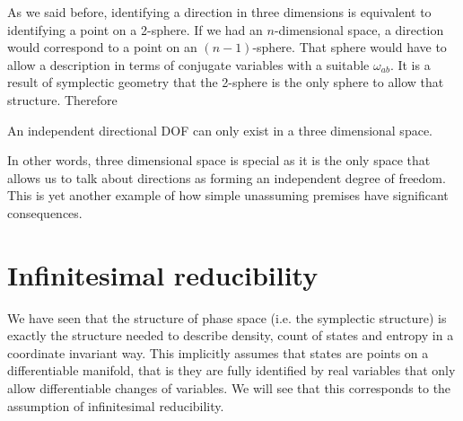 As we said before, identifying a direction in three dimensions is equivalent to identifying a point on a 2-sphere. If we had an $n$-dimensional space, a direction would correspond to a point on an $(n-1)$-sphere. That sphere would have to allow a description in terms of conjugate variables with a suitable $\omega_{ab}$. It is a result of symplectic geometry that the 2-sphere is the only sphere to allow that structure. Therefore
\begin{insight}
	An independent directional DOF can only exist in a three dimensional space.
\end{insight}

In other words, three dimensional space is special as it is the only space that allows us to talk about directions as forming an independent degree of freedom. This is yet another example of how simple unassuming premises have significant consequences.

\section{Infinitesimal reducibility}

We have seen that the structure of phase space (i.e. the symplectic structure) is exactly the structure needed to describe density, count of states and entropy in a coordinate invariant way. This implicitly assumes that states are points on a differentiable manifold, that is they are fully identified by real variables that only allow differentiable changes of variables. We will see that this corresponds to the assumption of infinitesimal reducibility.

